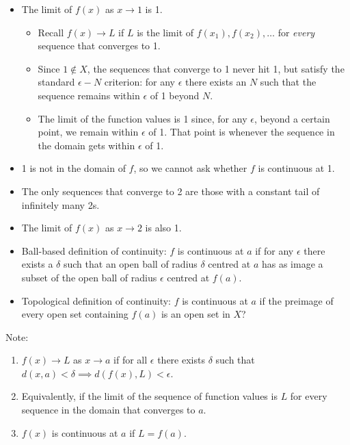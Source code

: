 \begin{itemize}

\item The limit of $f(x)$ as $x \to 1$ is 1.
  \begin{itemize}
  \item Recall $f(x) \to L$ if $L$ is the limit of $f(x_1), f(x_2), \ldots$ for {\it every} sequence that converges to 1.
  \item Since $1 \notin X$, the sequences that converge to 1 never hit 1, but satisfy the standard $\epsilon-N$
    criterion: for any $\epsilon$ there exists an $N$ such that the sequence remains within $\epsilon$ of 1
    beyond $N$.
  \item The limit of the function values is 1 since, for any $\epsilon$, beyond a certain point, we remain
    within $\epsilon$ of 1. That point is whenever the sequence in the domain gets within $\epsilon$ of 1.
  \end{itemize}

\item 1 is not in the domain of $f$, so we cannot ask whether $f$ is continuous at 1.

\item The only sequences that converge to 2 are those with a constant tail of infinitely many 2s.

\item The limit of $f(x)$ as $x \to 2$ is also 1.

\item Ball-based definition of continuity: $f$ is continuous at $a$ if for any $\epsilon$ there exists a
  $\delta$ such that an open ball of radius $\delta$ centred at $a$ has as image a subset of the open ball of
  radius $\epsilon$ centred at $f(a)$.

\item Topological definition of continuity: $f$ is continuous at $a$ if the preimage of every open set
  containing $f(a)$ is an open set in $X$?


\end{itemize}

Note:


\begin{enumerate}
\item $f(x) \to L$ as $x \to a$ if for all $\epsilon$ there exists $\delta$ such that $d(x, a) < \delta \implies d(f(x), L) < \epsilon$.
\item Equivalently, if the limit of the sequence of function values is $L$ for every sequence in the domain that
  converges to $a$.
\item $f(x)$ is continuous at $a$ if $L = f(a)$.
\end{enumerate}


